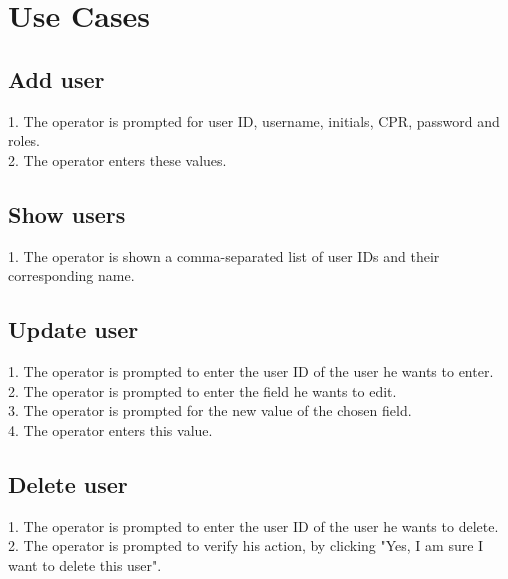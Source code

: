 \section{Use Cases}
\subsection{Add user}
1. The operator is prompted for user ID, username, initials, CPR, password and roles.\\
2. The operator enters these values.

\subsection{Show users}
1. The operator is shown a comma-separated list of user IDs and their corresponding name.

\subsection{Update user}
1. The operator is prompted to enter the user ID of the user he wants to enter.\\
2. The operator is prompted to enter the field he wants to edit.\\
3. The operator is prompted for the new value of the chosen field.\\
4. The operator enters this value.

\subsection{Delete user}
1. The operator is prompted to enter the user ID of the user he wants to delete.\\
2. The operator is prompted to verify his action, by clicking "Yes, I am sure I want to delete this user".